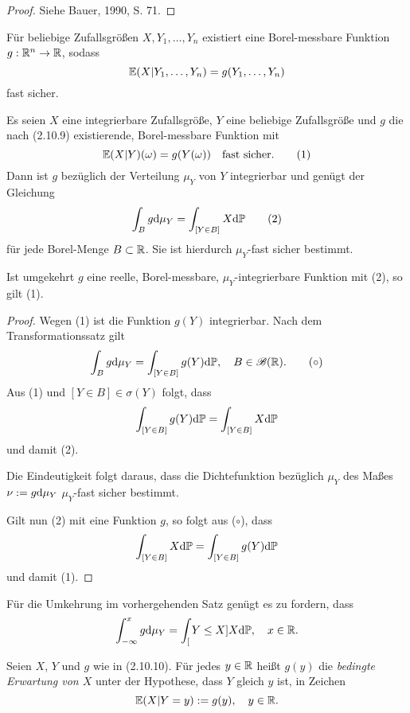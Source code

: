 \begin{proof}
  Siehe Bauer, 1990, S. 71.
\end{proof}

\begin{folg}
  Für beliebige Zufallsgrößen $X, Y_1, \ldots, Y_n$ existiert eine
  Borel-messbare Funktion $g : \mathbb{R}^n \to \mathbb{R}$, sodass
  \[ \mathbb{E}( X | Y_1, \ldots, Y_n) = g(Y_1, \ldots, Y_n) \]
  fast sicher.
\end{folg}

\begin{thm}
  Es seien $X$ eine integrierbare Zufallsgröße, $Y$ eine beliebige Zufallsgröße
  und $g$ die nach (2.10.9) existierende, Borel-messbare Funktion mit
  \[ \mathbb{E}( X | Y )(\omega) = g(Y(\omega)) \quad \text{fast sicher.} \tag{1} \]
  Dann ist $g$ bezüglich der Verteilung $\mu_Y$ von $Y$ integrierbar und genügt
  der Gleichung
  \[ \int_B g \mathrm{d} \mu_Y = \int_{[Y \in B]} X \mathrm{d} \mathbb{P} \tag{2} \]
  für jede Borel-Menge $B \subset \mathbb{R}$. Sie ist hierdurch $\mu_Y$-fast sicher
  bestimmt.

  Ist umgekehrt $g$ eine reelle, Borel-messbare, $\mu_Y$-integrierbare Funktion
  mit (2), so gilt (1).
\end{thm}

\begin{proof}
  Wegen (1) ist die Funktion $g(Y)$ integrierbar. Nach dem Transformationssatz
  gilt
  \[ \int_B g \mathrm{d} \mu_Y = \int_{[Y \in B]} g(Y) \mathrm{d} \mathbb{P}, \quad B \in
    \mathscr{B}(\mathbb{R}). \tag{$\circ$} \]
  Aus (1) und $[Y \in B] \in \sigma(Y)$ folgt, dass
  \[ \int_{[Y \in B]} g(Y) \mathrm{d} \mathbb{P} = \int_{[Y \in B]} X \mathrm{d} \mathbb{P} \]
  und damit (2).

  Die Eindeutigkeit folgt daraus, dass die Dichtefunktion bezüglich $\mu_Y$ des
  Maßes $\nu := g \mathrm{d} \mu_Y$ $\mu_Y$-fast sicher bestimmt.

  Gilt nun (2) mit eine Funktion $g$, so folgt aus ($\circ$), dass
  \[ \int_{[Y \in B]} X \mathrm{d} \mathbb{P} = \int_{[Y \in B]} g(Y) \mathrm{d} \mathbb{P} \]
  und damit (1).
\end{proof}

\begin{prgp}[Aufgabe]
  Für die Umkehrung im vorhergehenden Satz genügt es zu fordern, dass
  \[ \int_{-\infty}^x g \mathrm{d} \mu_Y = \int_[Y \le X] X \mathrm{d} \mathbb{P}, \quad x
    \in \mathbb{R}. \]
\end{prgp}

\begin{defn}
  Seien $X$, $Y$ und $g$ wie in (2.10.10). Für jedes $y \in \mathbb{R}$ heißt $g(y)$
  die \emph{bedingte Erwartung von $X$} unter der Hypothese, dass $Y$ gleich $y$
  ist, in Zeichen
  \[ \mathbb{E}(X | Y = y) := g(y), \quad y \in \mathbb{R}. \]
\end{defn}

